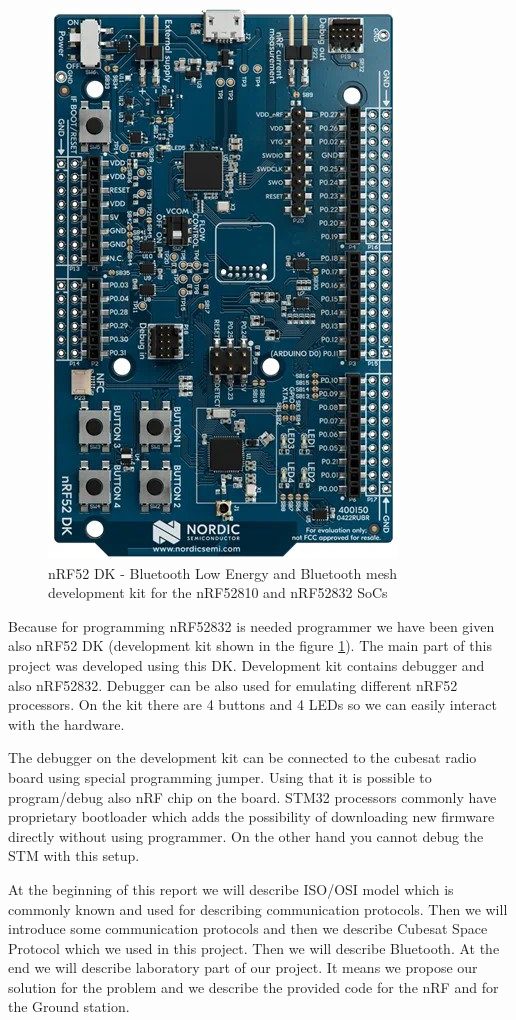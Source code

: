 \documentclass[conference]{IEEEtran}
\begin{document}
\begin{figure}[htbp]
\centerline{\includegraphics[scale=0.4]{images/nRF52-DK}}
\caption{nRF52 DK - Bluetooth Low Energy and Bluetooth mesh development kit for the nRF52810 and nRF52832 SoCs\cite{nrf-dk-shop}}
\label{nrfDK}
\end{figure}

Because for programming nRF52832 is needed programmer we have been given also nRF52 DK \cite{nrf-dk-shop} (development kit shown in the figure \ref{nrfDK}). The main part of this project was developed using this DK. Development kit contains debugger and also nRF52832. Debugger can be also used for emulating different nRF52 processors. On the kit there are 4 buttons and 4 LEDs so we can easily interact with the hardware.

The debugger on the development kit can be connected to the cubesat radio board using special programming jumper. Using that it is possible to program/debug also nRF chip on the board. STM32 processors commonly have proprietary bootloader which adds the possibility of downloading new firmware directly without using programmer. On the other hand you cannot debug the STM with this setup.

At the beginning of this report we will describe ISO/OSI model which is commonly known and used for describing communication protocols. Then we will introduce some communication protocols and then we describe Cubesat Space Protocol which we used in this project. Then we will describe Bluetooth. At the end we will describe laboratory part of our project. It means we propose our solution for the problem and we describe the provided code for the nRF and for the Ground station.
\end{document}

